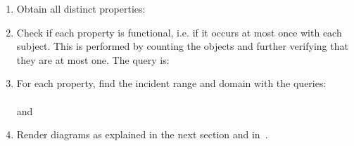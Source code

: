 \begin{enumerate}[leftmargin=0cm]
\item Obtain all distinct properties:\\
\item Check if each property is functional, i.e. if it
occurs at most once with each subject.
This is performed by counting the objects and further verifying
that they are at most one. The query is:\\
\item For each property, find the incident range and domain with the
queries:\\
 \\
and \\
\item Render diagrams as explained in the next section and in~\cite{losd}.
\end{enumerate}
